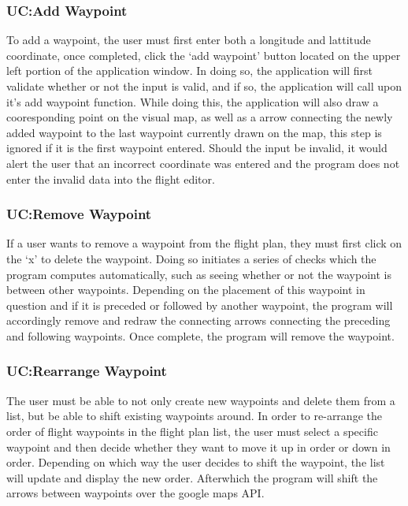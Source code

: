 \documentclass[12pt, letterpaper]{article}
\begin{document}
\subsubsection{UC:Add Waypoint}
To add a waypoint, the user must first enter both a longitude and lattitude coordinate, once completed, click the `add waypoint' button located on the upper left portion of the application window.
In doing so, the application will first validate whether or not the input is valid, and if so, the application will call upon it's add waypoint function.
While doing this, the application will also draw a cooresponding point on the visual map, as well as a arrow connecting the newly added waypoint to the last waypoint currently drawn on the map, this step is ignored if it is the first waypoint entered.
Should the input be invalid, it would alert the user that an incorrect coordinate was entered and the program does not enter the invalid data into the flight editor.

\clearpage
\subsubsection{UC:Remove Waypoint}
If a user wants to remove a waypoint from the flight plan, they must first click on the `x' to delete the waypoint.
Doing so initiates a series of checks which the program computes automatically, such as seeing whether or not the waypoint is between other waypoints.
Depending on the placement of this waypoint in question and if it is preceded or followed by another waypoint, the program will accordingly remove and redraw the connecting arrows connecting the preceding and following waypoints.
Once complete, the program will remove the waypoint.

\clearpage
\subsubsection{UC:Rearrange Waypoint}
The user must be able to not only create new waypoints and delete them from a list, but be able to shift existing waypoints around.
In order to re-arrange the order of flight waypoints in the flight plan list, the user must select a specific waypoint and then decide whether they want to move it up in order or down in order.
Depending on which way the user decides to shift the waypoint, the list will update and display the new order.
Afterwhich the program will shift the arrows between waypoints over the google maps API.
\end{document}
